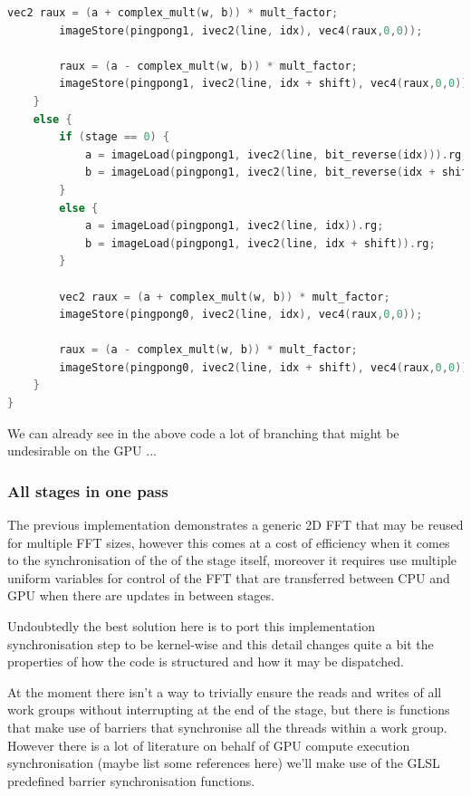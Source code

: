 \documentclass[
  oneside,
  11pt, a4paper,
  footinclude=true,
  headinclude=true,
  cleardoublepage=empty
]{scrbook}
\begin{document}
\begin{lstlisting}[language=C,caption={FFT Cooley-Tukey Vertical},label={lst:ct-vertical}]
        vec2 raux = (a + complex_mult(w, b)) * mult_factor;
        imageStore(pingpong1, ivec2(line, idx), vec4(raux,0,0));
            
        raux = (a - complex_mult(w, b)) * mult_factor;
        imageStore(pingpong1, ivec2(line, idx + shift), vec4(raux,0,0));
    }
    else {
        if (stage == 0) {
            a = imageLoad(pingpong1, ivec2(line, bit_reverse(idx))).rg;
            b = imageLoad(pingpong1, ivec2(line, bit_reverse(idx + shift))).rg;
        }
        else {	
            a = imageLoad(pingpong1, ivec2(line, idx)).rg;
            b = imageLoad(pingpong1, ivec2(line, idx + shift)).rg;
        }

        vec2 raux = (a + complex_mult(w, b)) * mult_factor;
        imageStore(pingpong0, ivec2(line, idx), vec4(raux,0,0));
            
        raux = (a - complex_mult(w, b)) * mult_factor;
        imageStore(pingpong0, ivec2(line, idx + shift), vec4(raux,0,0));
    }
}
\end{lstlisting}

We can already see in the above code a lot of branching that might be undesirable on the GPU  ... %

\subsubsection{All stages in one pass}

The previous implementation demonstrates a generic 2D FFT that may be reused for multiple FFT sizes, however this comes at a cost of efficiency when it comes to the synchronisation of the of the stage itself, moreover it requires use multiple uniform variables for control of the FFT that are transferred between CPU and GPU when there are updates in between stages.
\newline

Undoubtedly the best solution here is to port this implementation synchronisation step to be kernel-wise and this detail changes quite a bit the properties of how the code is structured and how it may be dispatched.

At the moment there isn't a way to trivially ensure the reads and writes of all work groups  \cite{stuart2011efficient} without interrupting at the end of the stage, but there is functions that make use of barriers that synchronise all the threads within a work group. However there is a lot of literature on behalf of GPU compute execution synchronisation (maybe list some references here) we'll make use of the GLSL predefined barrier synchronisation functions.
\end{document}

